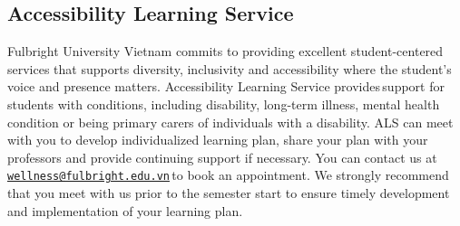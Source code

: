 \documentclass[
]{article}
\begin{document}
\subsection*{Accessibility Learning Service}\label{accessibility-learning-service}

Fulbright University Vietnam commits to providing excellent student-centered services that supports diversity, inclusivity and accessibility where the student's voice and presence matters. Accessibility Learning Service provides\,support for students with conditions, including disability, long-term illness, mental health condition or being primary carers of individuals with a disability. ALS can meet with you to develop individualized learning plan, share your plan with your professors and provide continuing support if necessary. You can contact us at\,\href{mailto:wellness@fulbright.edu.vn}{\nolinkurl{wellness@fulbright.edu.vn}}\,to book an appointment. We strongly recommend that you meet with us prior to the semester start to ensure timely development and implementation of your learning plan.
\end{document}

